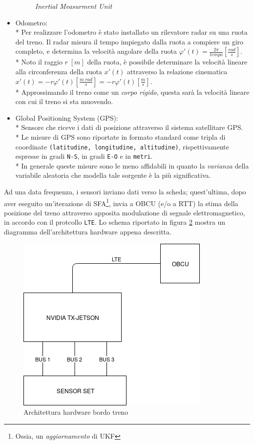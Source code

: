 \begin{itemize}
\begin{figure}[h]
		\caption{\emph{Inertial Measurment Unit}}
		\label{fig:imu}
	\end{figure}
	\item Odometro:\\*
	Per realizzare l'odometro \`e stato installato un rilevatore radar su una ruota del treno. Il radar misura il tempo impiegato dalla ruota a compiere un giro completo, e determina la velocit\`a angolare della ruota $\varphi'(t) = \frac{2\pi}{tempo} \left[ \frac{rad}{s}\right]$.\\*
	Noto il raggio $r\;[m]$ della ruota, \`e possibile determinare la velocit\`a lineare alla circonferenza della ruota  $x'(t)$ attraverso la relazione cinematica $x'(t) = -r\varphi'(t) \left[ \frac{m\;rad}{s}\right] = -r\varphi'(t) \left[ \frac{m}{s} \right]$.\\*
	Approssimando il treno come un \emph{corpo rigido}, questa sar\`a la velocit\`a lineare con cui il treno si sta muovendo.
	\item Global Positioning System (GPS):\\*
	Sensore che riceve i dati di posizione attraverso il sistema satellitare GPS.\\*
	Le misure di GPS sono riportate in formato standard come tripla di coordinate \texttt{(latitudine, longitudine, altitudine)}, rispettivamente espresse in gradi \texttt{N-S}, in gradi \texttt{E-O} e in \texttt{metri}.\\*
	In generale queste misure sono le meno affidabili in quanto la \emph{varianza} della variabile aleatoria che modella tale sorgente \`e la pi\`u significativa.
\end{itemize}
 Ad una data frequenza, i sensori inviano dati verso la scheda; quest'ultima, dopo aver eseguito un'iterazione di SFA\footnote{Ossia, un \emph{aggiornamento} di UKF}, invia a OBCU (e/o a RTT) la stima della posizione del treno attraverso apposita modulazione di segnale elettromagnetico, in accordo con il protcollo \texttt{LTE}. Lo schema riportato in figura \ref{fig:tdiagram} mostra un diagramma dell'architettura hardware appena descritta.
\begin{figure}[h]
	\centering
	\includegraphics[width=0.7\linewidth]{img/TrainDiagram}
	\caption{Architettura hardware bordo treno}
	\label{fig:tdiagram}
\end{figure}
